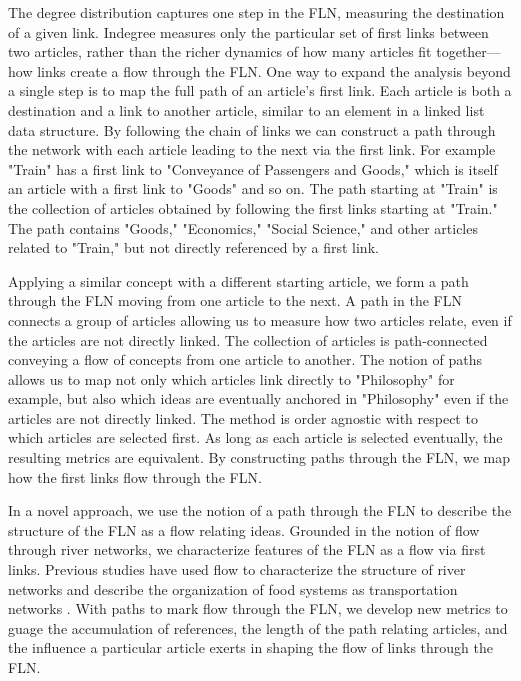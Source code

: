 \documentclass[pre,twocolumn,twoside,superscriptaddress,floatfix, aps, 10pt]{revtex4-1}
\begin{document}
The degree distribution captures one step in the FLN, measuring   
the destination of a given link. 
Indegree measures only the particular set of first links between two articles, 
rather than the richer dynamics of how many articles fit together---how links 
create a flow through the FLN.
One way to expand the analysis beyond a single step is to map the full path of 
an article's first link. 
Each article is both a destination and a link to another article, similar to an element 
in a linked list data structure. 
By following the chain of links we can construct a path through the network with each article 
leading to the next via the first link. 
For example "Train" has a first link to "Conveyance of Passengers and Goods," which is itself
an article with a first link to "Goods" and so on. The path starting at "Train" 
is the collection of articles obtained by following the first links starting at "Train."
The path contains "Goods," "Economics," "Social Science," and other articles related to 
"Train," but not directly referenced by a first link. 

Applying a similar concept with a 
different starting article, we form 
a path through the FLN moving from one article to the next.
A path in the FLN connects a group of articles allowing us to measure how two articles relate,
even if the articles are not directly linked. 
The collection of articles is path-connected conveying a flow of concepts from one article to another. 
The notion of paths allows us to map not only which articles link directly to "Philosophy" 
for example, but also which ideas are eventually anchored in "Philosophy" even if the articles
are not directly linked.
The method is order agnostic with respect to which articles are selected first. As long as each article is selected eventually, the resulting metrics are equivalent.
By constructing paths through the FLN, we 
map how the first links flow through the FLN.

In a novel approach, we use the notion of a path through the FLN to describe 
the structure of the FLN as a flow relating ideas. 
Grounded in the notion of flow through river networks,
\cite{geo_basins}
we characterize features of the FLN as a flow via first links.
Previous studies have used flow to characterize the structure of river networks
\cite{dodds} and describe the organization of food systems as transportation networks
\cite{food_webs}.
With paths to mark flow through the FLN, we develop new metrics to 
guage the accumulation of references, 
the length of the path relating articles, and the influence a particular
article exerts in shaping the flow of links through the FLN.
\end{document}
